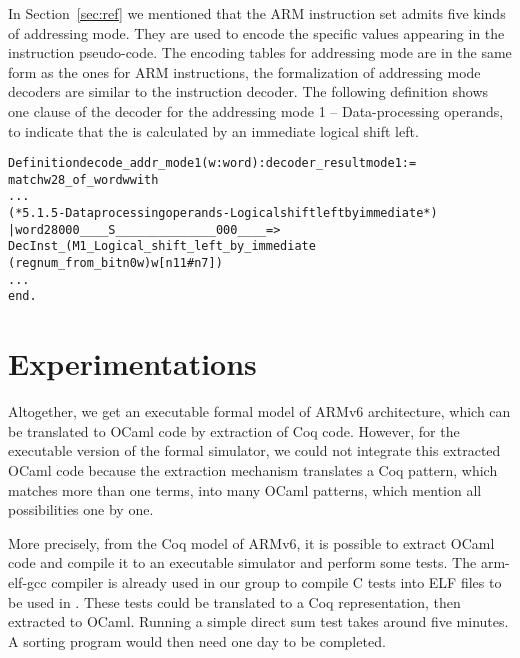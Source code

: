 In Section~\ref{sec:ref} we mentioned that
the ARM instruction set admits five kinds of addressing mode.
They are used to encode the specific values appearing
in the instruction pseudo-code.
The encoding tables for addressing mode are in the same form as the ones for
ARM instructions, the formalization of addressing mode decoders are
similar to the instruction decoder.
The following definition shows one clause of the decoder for the addressing
mode 1 -- Data-processing operands, to indicate that the 
is calculated by an immediate logical shift left. %

\begin{alltt}
 Definition decode_addr_mode1 (w : word) : decoder_result mode1:=
  match w28_of_word w with
  ...
  (*5.1.5 - Data processing operands - Logical shift left by immediate*)
  | word28 0 0 0 _ _ _ _ S_ _ _ _ _ _ _ _ _ _ _ _ _ _ 0 0 0 _ _ _ _ =>
    DecInst _ (M1_Logical_shift_left_by_immediate
                                     (regnum_from_bit n0 w) w[n11#n7])
   ...
  end.
\end{alltt}

\section{Experimentations}
\label{ssc:vali}

Altogether, we get an executable formal model of ARMv6 architecture,
which can be translated to OCaml code by extraction of Coq code.
However, for the executable version of the formal simulator,
we could not integrate this extracted OCaml code
because the extraction mechanism translates a Coq pattern,
which matches more than one terms, into many OCaml patterns,
which mention all possibilities one by one.

More precisely,
from the Coq model of ARMv6,
it is possible to extract OCaml code and compile it to an executable simulator
and perform some tests.
The {\stt arm-elf-gcc} compiler is already used in our group to
compile C tests into ELF files to be used in \simlight.
These tests could be translated
to a Coq representation, then extracted to OCaml.
Running a simple direct sum test takes around five minutes.
A sorting program would then need one day to be completed.


